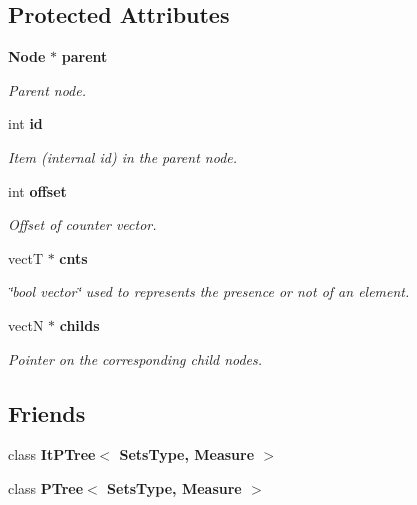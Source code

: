 \subsection*{Protected Attributes}
\begin{CompactItemize}
\item 
{\bf Node} $\ast$ {\bf parent}\label{class_node_039a14ac4e2dd6be991d7d81cf902296}

\begin{CompactList}\small\item\em Parent node. \item\end{CompactList}\item 
int {\bf id}\label{class_node_2a5bd864397d5f9015772e9163846f0f}

\begin{CompactList}\small\item\em Item (internal id) in the parent node. \item\end{CompactList}\item 
int {\bf offset}\label{class_node_23587c472f965fdb345553da8c43efbd}

\begin{CompactList}\small\item\em Offset of counter vector. \item\end{CompactList}\item 
vect\-T $\ast$ {\bf cnts}\label{class_node_9b5fd38081c3726f4b0080013dec36b1}

\begin{CompactList}\small\item\em \char`\"{}bool vector\char`\"{} used to represents the presence or not of an element. \item\end{CompactList}\item 
vect\-N $\ast$ {\bf childs}\label{class_node_ead9baf380a8c18deaf8cf3f4469c849}

\begin{CompactList}\small\item\em Pointer on the corresponding child nodes. \item\end{CompactList}\end{CompactItemize}
\subsection*{Friends}
\begin{CompactItemize}
\item 
class {\bf It\-PTree$<$ Sets\-Type, Measure $>$}\label{class_node_c7d742f89a5418f941e82b344fe4c463}

\item 
class {\bf PTree$<$ Sets\-Type, Measure $>$}\label{class_node_75985e4c63d08b10230ccb3b9f097182}

\end{CompactItemize}


